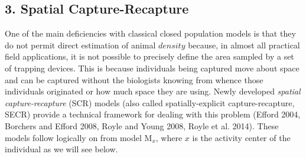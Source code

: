 \documentclass{book}
\begin{document}
\subsection*{3. Spatial Capture-Recapture}

One of the main deficiencies with classical closed population models
is that they do not permit direct estimation of animal $density$
because, in almost all practical field applications, it is not
possible to precisely define the area sampled by a set of trapping
devices. This is because individuals being captured move about space
and can be captured without the biologists knowing from whence those
individuals originated or how much space they are using. Newly
developed {\it spatial capture-recapture} (SCR) models (also called
spatially-explicit capture-recapture, SECR) provide a technical
framework for dealing with this problem (Efford 2004, Borchers and
Efford 2008, Royle and Young 2008, Royle et al. 2014). These models
follow logically on from model M$_x$, where $x$ is the activity center
of the individual as we will see below.
\end{document}
